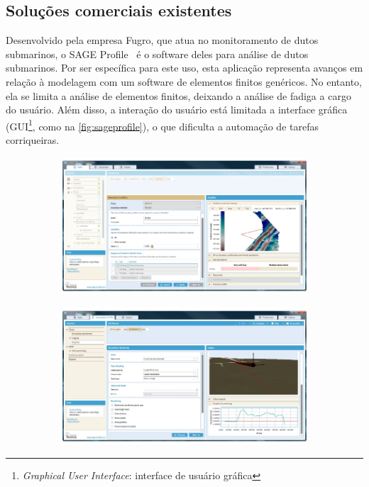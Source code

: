 \subsection{Soluções comerciais existentes}




Desenvolvido pela empresa Fugro, que atua no monitoramento de dutos submarinos, o SAGE Profile~\cite{sageprofile} é o software deles para análise de dutos submarinos. Por ser específica para este uso, esta aplicação representa avanços em relação à modelagem com um software de elementos finitos genéricos. No entanto, ela se limita a análise de elementos finitos, deixando a análise de fadiga a cargo do usuário. Além disso, a interação do usuário está limitada a interface gráfica (GUI\footnote{\textit{Graphical User Interface}: interface de usuário gráfica}, como na \autoref{fig:sageprofile}), o que dificulta a automação de tarefas corriqueiras.

\begin{figure}[!ht]
    \centering
    \caption{Interface gráfica do SAGE Profile.}\label{fig:sageprofile}
    \begin{subfigure}[t]{0.49\textwidth}
        \centering
        \includegraphics[width=\textwidth]{imagens/sage_profile_1}
    \end{subfigure}
    \hfill
    \begin{subfigure}[t]{0.49\textwidth}
        \centering
        \includegraphics[width=\textwidth]{imagens/sage_profile_2}
    \end{subfigure}
\end{figure}


